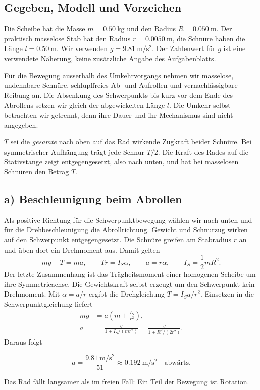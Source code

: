 
\subsection*{Gegeben, Modell und Vorzeichen}
Die Scheibe hat die Masse $m=\qty{0.50}{\kilogram}$ und den Radius
$R=\qty{0.050}{\metre}$. Der praktisch masselose Stab hat den Radius
$r=\qty{0.0050}{\metre}$, die Schnüre haben die Länge
$l=\qty{0.50}{\metre}$. Wir verwenden $g=\qty{9.81}{\metre\per\second\squared}$.
Der Zahlenwert für $g$ ist eine verwendete Näherung, keine zusätzliche Angabe
des Aufgabenblatts.

Für die Bewegung ausserhalb des Umkehrvorgangs nehmen wir masselose,
undehnbare Schnüre, schlupffreies Ab- und Aufrollen und vernachlässigbare
Reibung an. Die Absenkung des Schwerpunkts bis kurz vor dem Ende des Abrollens
setzen wir gleich der abgewickelten Länge $l$. Die Umkehr selbst betrachten wir
getrennt, denn ihre Dauer und ihr Mechanismus sind nicht angegeben.

$T$ sei die \emph{gesamte} nach oben auf das Rad wirkende Zugkraft beider
Schnüre. Bei symmetrischer Aufhängung trägt jede Schnur $T/2$. Die Kraft des
Rades auf die Stativstange zeigt entgegengesetzt, also nach unten, und hat bei
masselosen Schnüren den Betrag $T$.

\subsection*{a) Beschleunigung beim Abrollen}
Als positive Richtung für die Schwerpunktbewegung wählen wir nach unten und
für die Drehbeschleunigung die Abrollrichtung. Gewicht und Schnurzug wirken auf
den Schwerpunkt entgegengesetzt. Die Schnüre greifen am Stabradius $r$ an und
üben dort ein Drehmoment aus. Damit gelten
\begin{equation}
  mg-T=ma, \qquad Tr=I_S\alpha, \qquad a=r\alpha,
  \qquad I_S=\frac12 mR^2.
\end{equation}
Der letzte Zusammenhang ist das Trägheitsmoment einer homogenen Scheibe um
ihre Symmetrieachse. Die Gewichtskraft selbst erzeugt um den Schwerpunkt kein
Drehmoment. Mit $\alpha=a/r$ ergibt die Drehgleichung $T=I_Sa/r^2$. Einsetzen
in die Schwerpunktgleichung liefert
\begin{align}
  mg&=a\left(m+\frac{I_S}{r^2}\right),\\
  a&=\frac{g}{1+I_S/(mr^2)}
    =\frac{g}{1+R^2/(2r^2)}.
\end{align}
Daraus folgt
\begin{ergebnis}[a) Beschleunigung]
\begin{equation*}
  a=\frac{\qty{9.81}{\metre\per\second\squared}}{51}
   \approx\qty{0.192}{\metre\per\second\squared}\quad\text{abwärts}.
\end{equation*}
\end{ergebnis}
Das Rad fällt langsamer als im freien Fall: Ein Teil der Bewegung ist Rotation.

